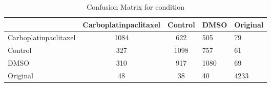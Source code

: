 \begin{table}[htbp]
\centering
\caption{Confusion Matrix for condition}
\label{tab:confusionmatrix.condition}
\begin{tabular}{|l|cc|}
\toprule
 & Carboplatinpaclitaxel & Control & DMSO & Original \\
\midrule
Carboplatinpaclitaxel & 1084 & 622 & 505 & 79 \\
Control & 327 & 1098 & 757 & 61 \\
DMSO & 310 & 917 & 1080 & 69 \\
Original & 48 & 38 & 40 & 4233 \\
\bottomrule
\end{tabular}
\end{table}
